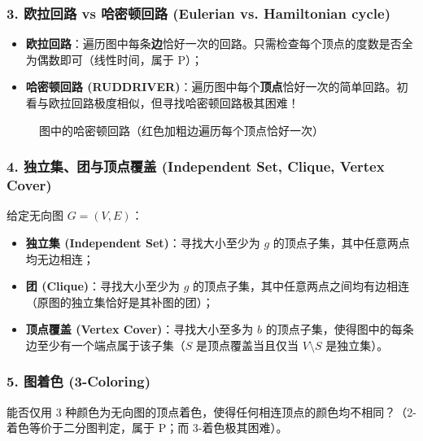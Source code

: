 \subsubsection*{3. 欧拉回路 vs 哈密顿回路 (Eulerian vs. Hamiltonian cycle)}
\begin{itemize}
    \item \textbf{欧拉回路}：遍历图中每条\textbf{边}恰好一次的回路。只需检查每个顶点的度数是否全为偶数即可（线性时间，属于 P）；
    \item \textbf{哈密顿回路 (RUDDRIVER)}：遍历图中每个\textbf{顶点}恰好一次的简单回路。初看与欧拉回路极度相似，但寻找哈密顿回路极其困难！
\end{itemize}

\begin{figure}[htbp]
\centering
{}
\caption{图中的哈密顿回路（红色加粗边遍历每个顶点恰好一次）}
\label{fig:hamiltonian_cycle}
\end{figure}

\subsubsection*{4. 独立集、团与顶点覆盖 (Independent Set, Clique, Vertex Cover)}
给定无向图 $G = (V, E)$：
\begin{itemize}
    \item \textbf{独立集 (Independent Set)}：寻找大小至少为 $g$ 的顶点子集，其中任意两点均无边相连；
    \item \textbf{团 (Clique)}：寻找大小至少为 $g$ 的顶点子集，其中任意两点之间均有边相连（原图的独立集恰好是其补图的团）；
    \item \textbf{顶点覆盖 (Vertex Cover)}：寻找大小至多为 $b$ 的顶点子集，使得图中的每条边至少有一个端点属于该子集（$S$ 是顶点覆盖当且仅当 $V \setminus S$ 是独立集）。
\end{itemize}

\subsubsection*{5. 图着色 (3-Coloring)}
能否仅用 3 种颜色为无向图的顶点着色，使得任何相连顶点的颜色均不相同？（2-着色等价于二分图判定，属于 P；而 3-着色极其困难）。

